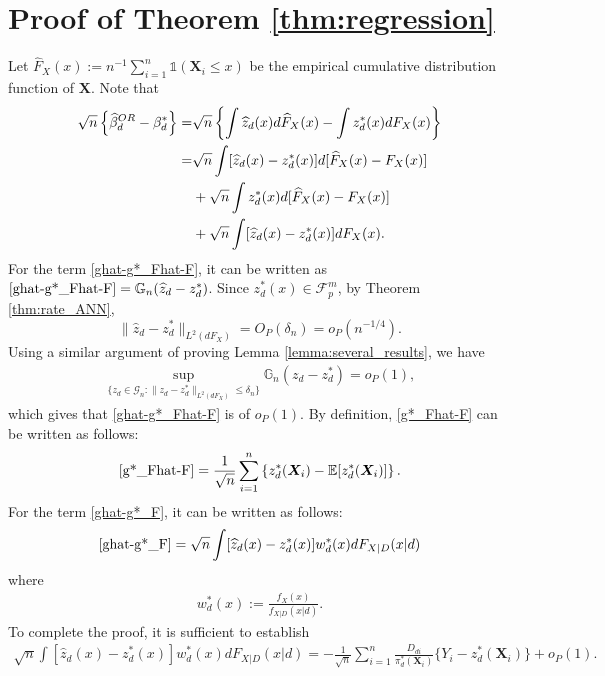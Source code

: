\documentclass[11pt]{article}
\numberwithin{equation}{section}
\begin{document}
\section{Proof of Theorem \ref{thm:regression}}\label{proof:thm:regression}
Let	$\widehat{F}_X(x):=n^{-1}\sum_{i=1}^n\mathds{1}(\boldsymbol{X}_{i}\leq x)$ be the empirical cumulative distribution function of $\boldsymbol{X}$. Note that
\begin{align}
	\sqrt{n}\left\{\widehat{\beta}_d^{OR} -\beta^*_d\right\}=&\sqrt{n}\left\{\int
	\widehat{z}_d(x)d\widehat{F}_X(x) -\int z_d^*(x)dF_X(x) \right\}\notag \\
	=&\sqrt{n}\int [\widehat{z}_d(x)-z^*_d(x)]d[\widehat{F}_X(x)-F_X(x)]\label{ghat-g*_Fhat-F}\\
	&+\sqrt{n}\int z^*_d(x)d[\widehat{F}_X(x)-F_X(x)] \label{g*_Fhat-F}\\
	&+\sqrt{n}\int [\widehat{z}_d(x)-z^*_d(x)]dF_X(x). \label{ghat-g*_F}
\end{align}
For the term \eqref{ghat-g*_Fhat-F}, it can be written as $\eqref{ghat-g*_Fhat-F}=\mathbb{G}_n(\widehat{z}_d-z^*_d)$. Since $z^*_d(x)\in\mathcal{F}_p^m$, by Theorem \ref{thm:rate_ANN},  $$\|\widehat{z}_d-z^*_d\|_{L^2(dF_X)}=O_P(\delta_n)=o_P(n^{-1/4}).$$ Using a similar argument of proving Lemma \ref{lemma:several_results}, we have
\begin{align*}
	\sup_{\{z_d\in \mathcal{G}_n:\|z_d-z^*_d\|_{L^2(dF_X)}\leq  \delta_n\}}\mathbb{G}_n(z_d-z^*_d)=o_P(1),
\end{align*}
which gives that \eqref{ghat-g*_Fhat-F} is of $o_P(1)$. By definition, \eqref{g*_Fhat-F} can be written as follows:
\begin{align*}
	\eqref{g*_Fhat-F}=\frac{1}{\sqrt{n}}\sum_{i=1}^n\left\{z_d^*(\boldsymbol{X}_{i})-\mathbb{E}[z_d^*(\boldsymbol{X}_{i})]\right\}.
\end{align*}	
For the term \eqref{ghat-g*_F},	it can be written as follows:
\begin{align*}
	\eqref{ghat-g*_F}=\sqrt{n}\int [\widehat{z}_d(x)-z^*_d(x)]w_d^*(x)dF_{X|D}(x|d)
\end{align*}
where
\begin{align*}
	w^*_d(x):=\frac{f_X(x)}{f_{X|D}(x|d)}.
\end{align*}
To complete the proof, it is sufficient to establish
\begin{align}\label{eq:ghat-g*_Fd}
	\sqrt{n} \int [\widehat{z}_d(x)-z^*_d(x)]w^*_d(x)dF_{X|D}(x|d)=- \frac{1}{\sqrt{n}}\sum_{i=1}^n\frac{D_{di}}{\pi_d^*(\boldsymbol{X}_{i})}\{Y_i-z^*_d(\boldsymbol{X}_{i})\}+o_P(1).
\end{align}
\end{document}
